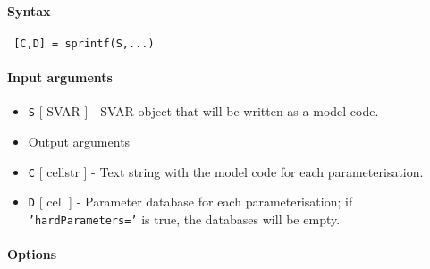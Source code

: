 


	\paragraph{Syntax}
 
 \begin{verbatim}
 [C,D] = sprintf(S,...)
 \end{verbatim}
 
 \paragraph{Input arguments}
 
 \begin{itemize}
 \item
   \texttt{S} {[} SVAR {]} - SVAR object that will be written as a model
   code.
 \item
   Output arguments
 \item
   \texttt{C} {[} cellstr {]} - Text string with the model code for each
   parameterisation.
 \item
   \texttt{D} {[} cell {]} - Parameter database for each
   parameterisation; if \texttt{'hardParameters='} is true, the databases
   will be empty.
 \end{itemize}
 
 \paragraph{Options}
 
